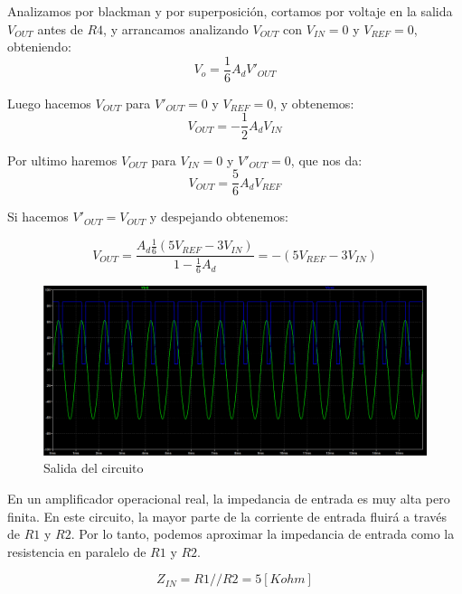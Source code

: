 \documentclass[12pt]{article}
\begin{document}
	Analizamos por blackman y por superposición, cortamos por voltaje en la salida $V_{OUT}$ antes de $R4$, y arrancamos analizando $V_{OUT}$ con $V_{IN} = 0$ y $V_{REF} = 0$, obteniendo:
	\begin{equation}
		V_{o} = \frac{1}{6} A_{d} V'_{OUT}
	\end{equation}
	
	Luego hacemos $V_{OUT}$ para $V'_{OUT} = 0$ y $V_{REF} = 0$, y obtenemos:
	\begin{equation}
		V_{OUT} = -\frac{1}{2} A_{d} V_{IN}
	\end{equation}

	Por ultimo haremos $V_{OUT}$ para $V_{IN} = 0$ y $V'_{OUT} = 0$, que nos da:
	\begin{equation}
		V_{OUT} = \frac{5}{6} A_{d} V_{REF}
	\end{equation}

	Si hacemos $V'_{OUT} = V_{OUT}$ y despejando obtenemos:

	\begin{equation}
		V_{OUT} = \frac{A_{d} \frac{1}{6} (5 V_{REF} - 3 V_{IN})}{1 - \frac{1}{6} A_{d}} = - (5 V_{REF} - 3V_{IN})
	\end{equation}
	
	\begin{figure}[]
		\includegraphics[width=1\linewidth]{Simulaciones-Resultados/Circuito4_Vo(Vi)}
		\caption[Salida del circuito]{Salida del circuito}
		\label{fig:circuito4vovi}
	\end{figure}
	En un amplificador operacional real, la impedancia de entrada es muy alta pero finita. En este circuito, la mayor parte de la corriente de entrada fluirá a través de $R1$ y $R2$. Por lo tanto, podemos aproximar la impedancia de entrada como la resistencia en paralelo de $R1$ y $R2$.
	
	\begin{equation}
		Z_{IN}=R1//R2=5[Kohm]
	\end{equation}
\end{document}
